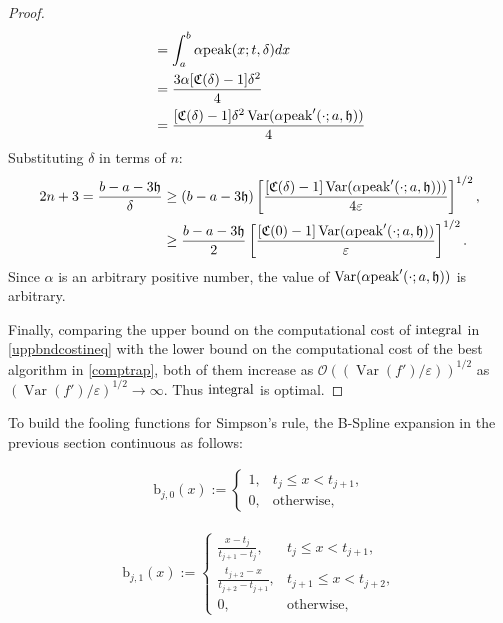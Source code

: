 \documentclass{iitthesis}
\DeclareMathOperator{\Var}{Var}
\theoremstyle{definition}
\theoremstyle{remark}
\begin{document}
\begin{proof}
\begin{subequations}
\begin{align*}
     &=\int_{a}^{b}\alpha\textup{peak}(x;t,\delta)dx\\
     &=\frac{3\alpha[\mathfrak{C}(\delta)-1]\delta^2}{4}\\
     &=\frac{[\mathfrak{C}(\delta)-1]\delta^2\Var(\alpha\textup{peak}'(\cdot;a,\mathfrak{h}))}{4}
  \end{align*}
  \end{subequations}
  Substituting $\delta$  in terms of $n$:
      \begin{align*}
        2n+3=\frac{b-a-3\mathfrak{h}}{\delta}&\ge(b-a-3\mathfrak{h})\left[\frac{[\mathfrak{C}(\delta)-1]\Var(\alpha \textup{peak}'(\cdot;a,\mathfrak{h})))}{4\varepsilon}\right]^{1/2},\\
        &\ge\frac{b-a-3\mathfrak{h}}{2}\left[\frac{[\mathfrak{C}(0)-1]\Var(\alpha \textup{peak}'(\cdot;a,\mathfrak{h}))}{\varepsilon}\right]^{1/2}.
    \end{align*}
    Since $\alpha$ is an arbitrary positive number, the value of $\Var(\alpha \textup{peak}'(\cdot;a,\mathfrak{h}))$ is arbitrary.

    Finally, comparing the upper bound on the computational cost of $\textup{integral}$ in \eqref{uppbndcostineq} with the lower bound on the computational cost of the best algorithm in \eqref{comptrap}, both of them increase as $\mathcal{O}((\Var(f')/\varepsilon))^{1/2}$ as $(\Var(f')/\varepsilon)^{1/2}\rightarrow \infty$. Thus $\textup{integral}$ is optimal.
\end{proof}


To build the fooling functions for Simpson's rule, the B-Spline expansion in the previous section continuous as follows:

\begin{align*}
  \text{b}_{j,0}(x):= \begin{cases} \displaystyle 1, & t_{j} \le x < t_{j+1},\\[1ex]
\displaystyle  0, & \text{otherwise},
\end{cases}
\end{align*}

\begin{align*}
  \text{b}_{j,1}(x):= \begin{cases} \displaystyle \frac{x-t_{j}}{t_{j+1}-t_{j}}, & t_{j} \le x < t_{j+1},\\[1ex]
\displaystyle \frac{t_{j+2}-x}{t_{j+2}-t_{j+1}}, & t_{j+1} \le x < t_{j+2},\\[1ex]
\displaystyle  0, & \text{otherwise},
\end{cases}
\end{align*}
\end{document}
